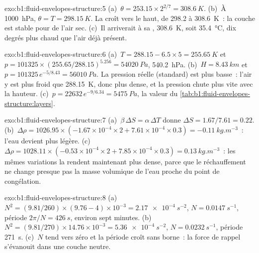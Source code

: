 \begin{solution}{exo:b1:fluid-envelopes-structure:5}
(a)~$\theta = 253.15 \times 2^{2/7} = \qty{308.6}{K}$. (b)~À \qty{1000}{hPa},
$\theta = T = \qty{298.15}{K}$. La  croît vers le haut, de
298.2 à \qty{308.6}{K}~: la couche est stable pour de l'air sec. (c)~Il arriverait à
sa , \qty{308.6}{K}, soit \qty{35.4}{\celsius}, dix
degrés plus chaud que l'air déjà présent.
\end{solution}

\begin{solution}{exo:b1:fluid-envelopes-structure:6}
(a)~$T = 288.15 - 6.5 \times 5 = \qty{255.65}{K}$ et $p = \num{101325} \times
(255.65/288.15)^{5.256} = \qty{54020}{Pa}$, \qty{540.2}{hPa}. (b)~$H =
\qty{8.43}{km}$ et $p = \num{101325}\,e^{-5/8.43} = \qty{56010}{Pa}$. La pression
réelle (standard) est plus basse~: l'air y est plus froid que \qty{288.15}{K}, donc
plus dense, et la pression chute plus vite avec la hauteur. (c)~$p = \num{22632}\,
e^{-9/6.34} = \qty{5475}{Pa}$, la valeur du
\cref{tab:b1:fluid-envelopes-structure:layers}.
\end{solution}

\begin{solution}{exo:b1:fluid-envelopes-structure:7}
(a)~$\beta\,\Delta S = \alpha\,\Delta T$ donne $\Delta S = 1.67/7.61 = 0.22$.
(b)~$\Delta\rho = 1026.95 \times (-1.67\times10^{-4} \times 2 + 7.61\times10^{-4}
\times 0.3) = \qty{-0.11}{kg.m^{-3}}$~: l'eau devient plus légère.
(c)~$\Delta\rho = 1028.11 \times (-0.53\times10^{-4} \times 2 + 7.85\times10^{-4}
\times 0.3) = \qty{+0.13}{kg.m^{-3}}$~: les mêmes variations la rendent maintenant plus dense, parce que
le réchauffement ne change presque pas la masse volumique de l'eau proche du point de congélation.
\end{solution}

\begin{solution}{exo:b1:fluid-envelopes-structure:8}
(a)~$N^2 = (9.81/260) \times (9.76 - 4)\times10^{-3} = \qty{2.17e-4}{s^{-2}}$,
$N = \qty{0.0147}{s^{-1}}$, période $2\pi/N = \qty{426}{s}$, environ sept
minutes. (b)~$N^2 = (9.81/270) \times 14.76\times10^{-3} = \qty{5.36e-4}{s^{-2}}$,
$N = \qty{0.0232}{s^{-1}}$, période \qty{271}{s}. (c)~$N$ tend vers zéro et la
période croît sans borne~: la force de rappel s'évanouit dans une couche neutre.
\end{solution}

